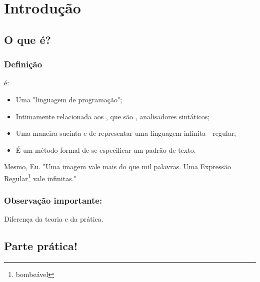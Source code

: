 \section{Introdução} 
\frame{\tableofcontents[currentsection]}

\subsection{O que é?} %

\begin{frame}
	\frametitle{Definição}

	\Large{ é:}

	\begin{itemize}
		\item Uma "linguagem de programação"\cite{hopcroft};
		\item Intimamente relacionada aos , que são \textit{}, analisadores sintáticos\cite{hopcroft};
		\item Uma maneira sucinta e  de representar uma linguagem infinita - regular;
		\item É um método formal de se especificar um padrão de texto\cite{aurelio}.
	\end{itemize}

\end{frame}

\begin{frame}
	\begin{block}{Mesmo, Eu.}
	"Uma imagem vale mais do que mil palavras. Uma Expressão Regular\footnote{bombeável} vale infinitas."
	\end{block}
\end{frame}

\begin{frame}
	\frametitle{Observação importante:}
	\centering \Large{Diferença da teoria e da prática.}
\end{frame}

\subsection{Parte prática!}


